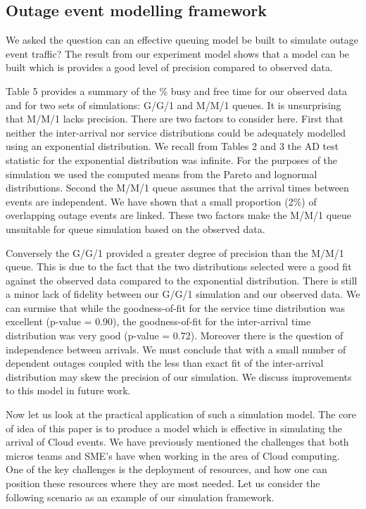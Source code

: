 \documentclass[5p]{elsarticle}
\begin{document}
\subsection{Outage event modelling framework}

We asked the question can an effective queuing model be built to simulate outage event traffic? The result from our experiment model shows that a model can be built which is provides a good level of precision compared to observed data.

Table 5 provides a summary of the \% busy and free time for our observed data and for two sets of simulations: G/G/1 and M/M/1 queues. It is unsurprising that M/M/1 lacks precision. There are two factors to consider here. First that neither the inter-arrival nor service distributions could be adequately modelled using an exponential distribution. We recall from Tables 2 and 3 the AD test statistic for the exponential distribution was infinite. For the purposes of the simulation we used the computed means from the Pareto and lognormal distributions. Second the M/M/1 queue assumes that the arrival times between events are independent. We have shown that a small proportion (2\%) of overlapping outage events are linked. These two factors make the M/M/1 queue unsuitable for queue simulation based on the observed data.

Conversely the G/G/1 provided a greater degree of precision than the M/M/1 queue. This is due to the fact that the two distributions selected were a good fit against the observed data compared to the exponential distribution. There is still a minor lack of fidelity between our G/G/1 simulation and our observed data. We can surmise that while the goodness-of-fit for the service time distribution 
was excellent (p-value = 0.90), the goodness-of-fit for the inter-arrival time distribution was very good (p-value = 0.72). Moreover there is the question of independence between arrivals. We must conclude that with a small number of dependent outages coupled with the less than exact fit of the inter-arrival distribution may skew the precision of our simulation. We discuss improvements to this model in future work.

Now let us look at the practical application of such a simulation model. The core of idea of this paper is to produce a model which is effective in simulating the arrival of Cloud events. We have previously mentioned the challenges that both micros teams and SME's have when working in the area of Cloud computing. One of the key challenges is the deployment of resources, and how one can position these resources where they are most needed. Let us consider the following scenario as an example of our simulation framework. 
\end{document}
